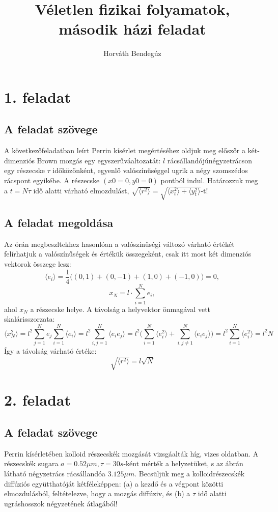 \documentclass[12pt]{article}
\title{Véletlen fizikai folyamatok, második házi feladat}
\author{Horváth Bendegúz}
\begin{document}
\maketitle



\section*{1. feladat}

\subsection*{ A feladat szövege} A következőfeladatban leírt Perrin kísérlet megértéséhez oldjuk meg előszőr a két-dimenziós Brown mozgás
egy egyszerűváaltozatát: $l$ rácsállandójúnégyzetrácson egy részecske $\tau$ időközönként, egyenlő valószínűséggel ugrik a négy szomszédos rácspont egyikébe. A részecske $ (x0 = 0, y0 = 0)$ pontból indul.
Határozzuk meg a $t = N\tau $ idő alatti várható elmozdulást,  $\sqrt{\langle r^2 \rangle }= \sqrt{\langle x^2_t \rangle+ \langle y^2_t\rangle}$-t!

 
\subsection*{A feladat megoldása} Az órán megbeszltekhez hasonlóan a valószínűségi változó várható értékét felírhatjuk a valószínűségek és értékük összegeként, csak itt most két dimenziós vektorok összege lesz:
$$\langle e_i \rangle = \frac{1}{4}\big ( (0, 1)+(0,-1)+(1,0)+(-1,0)\big ) =0, $$
$$ x_N = l\cdot \sum_{i=1}^N e_i,$$
ahol $x_N$ a részecske helye. A távolság a helyvektor önmagával vett skalárisszorzata:
$$\langle x^2_N\rangle = l^2\sum_{j=1}^Ne_j\sum_{i=1}^N \langle e_i \rangle = l^2\sum_{i,j=1}^N \langle e_i e_j\rangle = l^2 \Big (\sum_{i=1}^N \langle e^2_i \rangle +\sum_{i,j \neq 1}^N\langle e_i e_j \rangle \Big ) = l^2 \sum_{i=1}^N \langle e^2_i \rangle = {l^2N}$$
Így a távolság várható értéke:
$$\sqrt{\langle r^2 \rangle} = l\sqrt{N} $$
 
\newpage
\section*{2. feladat}

\subsection*{ A feladat szövege}
Perrin kísérletében kolloid részecskék mozgását vizsgáalták híg, vizes oldatban. A részecskék sugara
$a = 0.52\mu m, \tau = 30s$-ként mérték a helyzetüket, s az ábrán látható négyzetrács rácsállandóa $3.125\mu m$. Becsüljük meg a kolloidrészecskék diffúziós együtthatóját kétféleképpen: (a) a kezdő és a végpont közötti elmozdulásból, feltételezve, hogy a mozgás diffúziv, és (b) a $\tau$ idő alatti ugráshosszok négyzetének átlagából!
\end{document}
